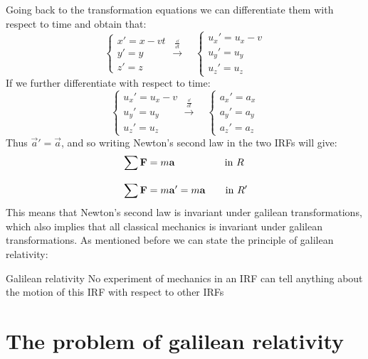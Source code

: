 Going back to the transformation equations we can differentiate them with respect to time and obtain that:
\begin{equation}
  \begin{cases}
    x' = x - vt\\[8pt]
    y' = y\\[8pt]
    z' = z
  \end{cases}
  \overset{\frac{\dd{}}{\dd{t}}}{\longrightarrow} \quad
  \begin{cases}
    u_x' = u_x - v\\[8pt]
    u_y' = u_y\\[8pt]
    u_z' = u_z
  \end{cases}
\end{equation}
If we further differentiate with respect to time:
\begin{equation}
  \begin{cases}
    u_x' = u_x - v\\[8pt]
    u_y' = u_y\\[8pt]
    u_z' = u_z
  \end{cases}
  \overset{\frac{\dd{}}{\dd{t}}}{\longrightarrow} \quad
  \begin{cases}
    a_x' = a_x\\[8pt]
    a_y' = a_y\\[8pt]
    a_z' = a_z
  \end{cases}
\end{equation}
Thus $\vec{a}' = \vec{a}$, and so writing Newton's second law in the two IRFs will give:
\begin{equation}
  \begin{split}
      &\displaystyle\sum \vb{F} = m \vb{a} \quad \quad \quad \quad \quad \text{in } R\\[8pt]
      &\displaystyle\sum \vb{F} = m \vb{a}' = m \vb{a} \quad \quad \text{in } R'
  \end{split}
\end{equation}
This means that Newton's second law is invariant under galilean transformations, which also implies that all classical mechanics is invariant under galilean transformations. As mentioned before we can state the principle of galilean relativity:
\begin{theorem}{Galilean relativity}
  No experiment of mechanics in an IRF can tell anything about the motion of this IRF with respect to other IRFs
\end{theorem}
\section{The problem of galilean relativity}
